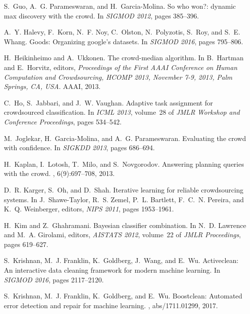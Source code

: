 \documentclass[11pt]{article}
\newcounter{alg}[section]
\begin{document}
\begin{thebibliography}{10}
	S.~Guo, A.~G. Parameswaran, and H.~Garcia{-}Molina.
	\newblock So who won?: dynamic max discovery with the crowd.
	\newblock In {\em {SIGMOD} 2012}, pages 385--396.
	
	A.~Y. Halevy, F.~Korn, N.~F. Noy, C.~Olston, N.~Polyzotis, S.~Roy, and S.~E.
	Whang.
	\newblock Goods: Organizing google's datasets.
	\newblock In {\em {SIGMOD} 2016}, pages 795--806.
	
	H.~Heikinheimo and A.~Ukkonen.
	\newblock The crowd-median algorithm.
	\newblock In B.~Hartman and E.~Horvitz, editors, {\em Proceedings of the First
		{AAAI} Conference on Human Computation and Crowdsourcing, {HCOMP} 2013,
		November 7-9, 2013, Palm Springs, CA, {USA}}. {AAAI}, 2013.
	
	C.~Ho, S.~Jabbari, and J.~W. Vaughan.
	\newblock Adaptive task assignment for crowdsourced classification.
	\newblock In {\em {ICML} 2013}, volume~28 of {\em {JMLR} Workshop and
		Conference Proceedings}, pages 534--542.
	
	M.~Joglekar, H.~Garcia{-}Molina, and A.~G. Parameswaran.
	\newblock Evaluating the crowd with confidence.
	\newblock In {\em {SIGKDD} 2013}, pages 686--694.
	
	H.~Kaplan, I.~Lotosh, T.~Milo, and S.~Novgorodov.
	\newblock Answering planning queries with the crowd.
	, 6(9):697--708, 2013.
	
	D.~R. Karger, S.~Oh, and D.~Shah.
	\newblock Iterative learning for reliable crowdsourcing systems.
	\newblock In J.~Shawe{-}Taylor, R.~S. Zemel, P.~L. Bartlett, F.~C.~N. Pereira,
	and K.~Q. Weinberger, editors, {\em NIPS 2011}, pages 1953--1961.
	
	H.~Kim and Z.~Ghahramani.
	\newblock Bayesian classifier combination.
	\newblock In N.~D. Lawrence and M.~A. Girolami, editors, {\em {AISTATS} 2012},
	volume~22 of {\em {JMLR} Proceedings}, pages 619--627.
	
	S.~Krishnan, M.~J. Franklin, K.~Goldberg, J.~Wang, and E.~Wu.
	\newblock Activeclean: An interactive data cleaning framework for modern
	machine learning.
	\newblock In {\em {SIGMOD} 2016}, pages 2117--2120.
	
	S.~Krishnan, M.~J. Franklin, K.~Goldberg, and E.~Wu.
	\newblock Boostclean: Automated error detection and repair for machine
	learning.
	, abs/1711.01299, 2017.
	

\end{thebibliography}
\end{document}
